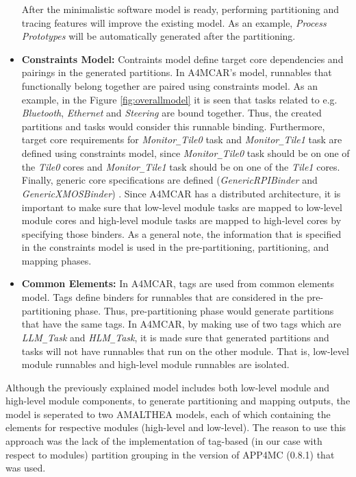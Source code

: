 \begin{itemize}
	After the minimalistic software model is ready, performing partitioning and tracing features will improve the existing model. As an example, \textit{Process Prototypes} will be automatically generated after the partitioning.
	\item \textbf{Constraints Model:} Contraints model define target core dependencies and pairings in the generated partitions. In A4MCAR's model, runnables that functionally belong together are paired using constraints model. As an example, in the Figure \ref{fig:overallmodel} it is seen that tasks related to e.g. \textit{Bluetooth}, \textit{Ethernet} and \textit{Steering} are bound together. Thus, the created partitions and tasks would consider this runnable binding. Furthermore, target core requirements for \textit{Monitor\texttt{\_}Tile0} task and \textit{Monitor\texttt{\_}Tile1} task are defined using constraints model, since \textit{Monitor\texttt{\_}Tile0} task should be on one of the \textit{Tile0} cores and \textit{Monitor\texttt{\_}Tile1} task should be on one of the \textit{Tile1} cores. Finally, generic core specifications are defined (\textit{GenericRPIBinder} and \textit{GenericXMOSBinder}) . Since A4MCAR has a distributed architecture, it is important to make sure that low-level module tasks are mapped to low-level module cores and high-level module tasks are mapped to high-level cores by specifying those binders.
	As a general note, the information that is specified in the constraints model is used in the pre-partitioning, partitioning, and mapping phases.
	\item \textbf{Common Elements:} In A4MCAR, tags are used from common elements model. Tags define binders for runnables that are considered in the pre-partitioning phase. Thus, pre-partitioning phase would generate partitions that have the same tags. In A4MCAR, by making use of two tags which are \textit{LLM\texttt{\_}Task} and \textit{HLM\texttt{\_}Task}, it is made sure that generated partitions and tasks will not have runnables that run on the other module. That is, low-level module runnables and high-level module runnables are isolated.   
\end{itemize}
Although the previously explained model includes both low-level module and high-level module components, to generate partitioning and mapping outputs, the model is seperated to two AMALTHEA models, each of which containing the elements for respective modules (high-level and low-level). The reason to use this approach was the lack of the implementation of tag-based (in our case with respect to modules) partition grouping in the version of APP4MC (0.8.1) that was used. 

